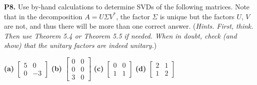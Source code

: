 \documentclass[12pt]{amsart}
\newcommand{\prob}[1]{\bigskip\noindent\textbf{#1.}\quad }
\newcommand{\ds}{\displaystyle}
\begin{document}
\prob{P8}  Use by-hand calculations to determine SVDs of the following matrices.  Note that in the decomposition $A = U \Sigma V^*$, the factor $\Sigma$ is unique but the factors $U$, $V$ are not, and thus there will be more than one correct answer.  (\emph{Hints.  First, think.  Then use Theorem 5.4 or Theorem 5.5 if needed.  When in doubt, check (and show) that the unitary factors are indeed unitary.})

\textbf{(a)} \quad $\ds \begin{bmatrix} 5 & 0 \\ 0 & -3 \end{bmatrix}$ \qquad
\textbf{(b)} \quad $\ds \begin{bmatrix} 0 & 0 \\ 0 & 0 \\ 3 & 0 \end{bmatrix}$ \qquad
\textbf{(c)} \quad $\ds \begin{bmatrix} 0 & 0 \\ 1 & 1 \end{bmatrix}$ \qquad
\textbf{(d)} \quad $\ds \begin{bmatrix} 2 & 1 \\ 1 & 2 \end{bmatrix}$
\end{document}
